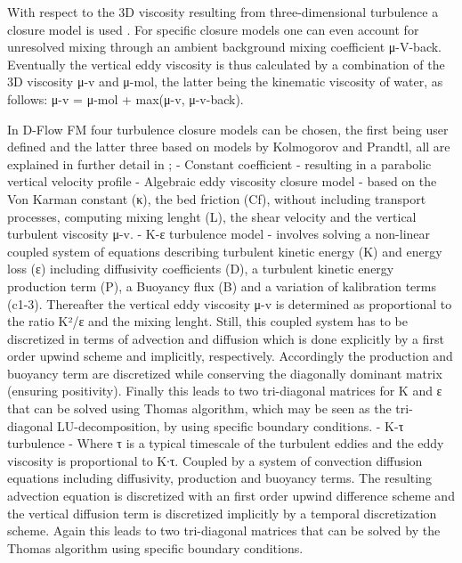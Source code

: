 With respect to the 3D viscosity resulting from three-dimensional
turbulence a closure model is used \citep[p.26]{DFlowTechMan}. For
specific closure models one can even account for unresolved mixing
through an ambient background mixing coefficient μ-V-back. Eventually
the vertical eddy viscosity is thus calculated by a combination of the
3D viscosity μ-v and μ-mol, the latter being the kinematic viscosity of
water, as follows: μ-v = μ-mol + max(μ-v, μ-v-back).

In D-Flow FM four turbulence closure models can be chosen, the first
being user defined and the latter three based on models by Kolmogorov
and Prandtl, all are explained in further detail in
\citep[p.112-120]{DFlowTechMan}; - Constant coefficient - resulting in a
parabolic vertical velocity profile - Algebraic eddy viscosity closure
model - based on the Von Karman constant (κ), the bed friction (Cf),
without including transport processes, computing mixing lenght (L), the
shear velocity and the vertical turbulent viscosity μ-v. - Κ-ε
turbulence model - involves solving a non-linear coupled system of
equations describing turbulent kinetic energy (Κ) and energy loss (ε)
including diffusivity coefficients (D), a turbulent kinetic energy
production term (P), a Buoyancy flux (B) and a variation of kalibration
terms (c1-3). Thereafter the vertical eddy viscosity μ-v is determined
as proportional to the ratio Κ²/ε and the mixing lenght. Still, this
coupled system has to be discretized in terms of advection and diffusion
which is done explicitly by a first order upwind scheme and implicitly,
respectively. Accordingly the production and buoyancy term are
discretized while conserving the diagonally dominant matrix (ensuring
positivity). Finally this leads to two tri-diagonal matrices for Κ and ε
that can be solved using Thomas algorithm, which may be seen as the
tri-diagonal LU-decomposition, by using specific boundary conditions. -
Κ-τ turbulence - Where τ is a typical timescale of the turbulent eddies
and the eddy viscosity is proportional to Κ∙τ. Coupled by a system of
convection diffusion equations including diffusivity, production and
buoyancy terms. The resulting advection equation is discretized with an
first order upwind difference scheme and the vertical diffusion term is
discretized implicitly by a temporal discretization scheme. Again this
leads to two tri-diagonal matrices that can be solved by the Thomas
algorithm using specific boundary conditions.

